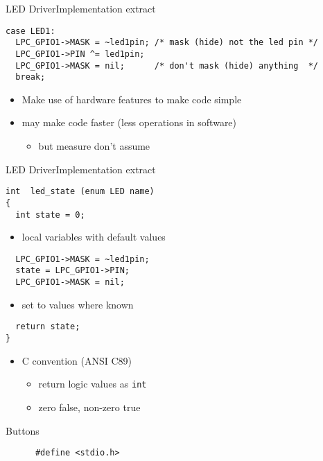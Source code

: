 \documentclass[svgnames,x11names]{beamer}
\begin{document}
\begin{frame}[fragile]{LED Driver}{Implementation extract}
  \begin{verbatim}
case LED1:
  LPC_GPIO1->MASK = ~led1pin; /* mask (hide) not the led pin */
  LPC_GPIO1->PIN ^= led1pin;
  LPC_GPIO1->MASK = nil;      /* don't mask (hide) anything  */
  break;
\end{verbatim}

\begin{itemize}
\item Make use of hardware features to make code simple
\item may make code faster (less operations in software) 
  \begin{itemize}
  \item but measure \alert{don't} assume
  \end{itemize}
\end{itemize}
\end{frame}
                    
\begin{frame}[fragile]{LED Driver}{Implementation extract}
  \begin{verbatim}
int  led_state (enum LED name)
{
  int state = 0;
\end{verbatim}
\begin{itemize}
\item local variables with default values
\end{itemize}
\begin{verbatim}
  LPC_GPIO1->MASK = ~led1pin;
  state = LPC_GPIO1->PIN;
  LPC_GPIO1->MASK = nil;
\end{verbatim}
\begin{itemize}
\item set to values where known
\end{itemize}
\begin{verbatim}
  return state;
}  
  \end{verbatim}
  \begin{itemize}
  \item C convention (ANSI C89)
    \begin{itemize}
    \item return logic values as \texttt{int}
    \item zero false, non-zero true
    \end{itemize}
  \end{itemize}
\end{frame}

\begin{frame}[fragile]{Buttons}
  \begin{block}{}
    \begin{verbatim}
      #define <stdio.h>
    \end{verbatim}
  \end{block}
\end{frame}

\end{document}

